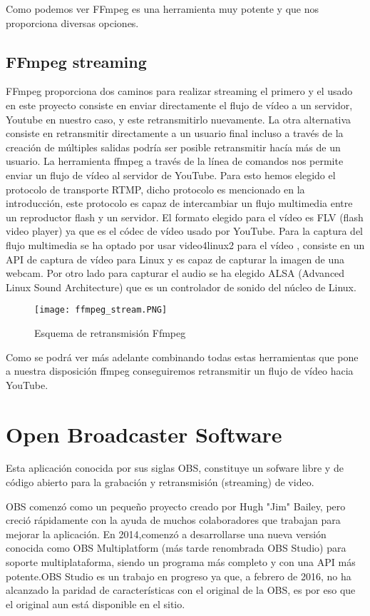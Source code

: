 Como podemos ver FFmpeg es una herramienta muy potente y que nos proporciona diversas opciones.

\subsection{FFmpeg streaming}

FFmpeg proporciona dos caminos para realizar streaming el primero y el usado en este proyecto consiste en enviar directamente el flujo de vídeo a un servidor, Youtube en nuestro caso, y este retransmitirlo nuevamente. La otra alternativa consiste en retransmitir directamente a un usuario final incluso a través de la creación de múltiples salidas podría ser posible retransmitir hacía más de un usuario.
La herramienta ffmpeg a través de la línea de comandos nos permite enviar un flujo de vídeo al servidor de YouTube. Para esto hemos elegido el protocolo de transporte RTMP, dicho protocolo es mencionado en la introducción, este protocolo es capaz de intercambiar un flujo multimedia entre un reproductor flash y un servidor. El formato elegido para el vídeo es FLV (flash video player) ya que es el códec de vídeo usado por YouTube.  
Para la captura del flujo multimedia se ha optado por usar video4linux2 para el vídeo , consiste en  un API de captura de vídeo para Linux y es capaz de capturar la imagen de una webcam. Por otro lado para capturar el audio se ha elegido ALSA (Advanced Linux Sound Architecture) que es un controlador de sonido del núcleo de Linux.

\begin{figure}[H]
    \centering
    \texttt{[image: ffmpeg\_stream.PNG]}
    \caption{Esquema de retransmisión Ffmpeg}
\end{figure}

Como se podrá ver más adelante combinando todas estas herramientas que pone a nuestra disposición ffmpeg conseguiremos retransmitir un flujo de vídeo hacia YouTube.

\section{Open Broadcaster Software}

Esta aplicación conocida por sus siglas OBS, constituye un sofware libre y de código abierto para la grabación y retransmisión (streaming) de video.

OBS comenzó como un pequeño proyecto creado por Hugh "Jim" Bailey, pero creció rápidamente con la ayuda de muchos colaboradores que trabajan para mejorar la aplicación. En 2014,comenzó a desarrollarse una nueva versión conocida como OBS Multiplatform (más tarde renombrada OBS Studio) para soporte multiplataforma, siendo un programa más completo y con una API más potente.OBS Studio es un trabajo en progreso ya que, a febrero de 2016, no ha alcanzado la paridad de características con el original de la OBS, es por eso que el original aun está disponible en el sitio.

